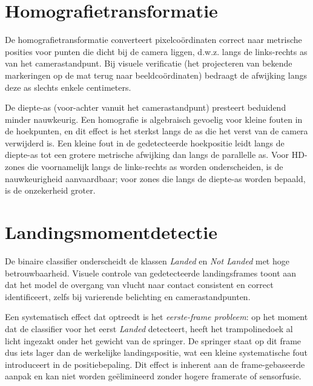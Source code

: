 
\section{Homografietransformatie}
\label{sec:evaluatie-homografie}

De homografietransformatie converteert pixelco{\"o}rdinaten correct naar metrische posities voor punten die dicht bij de camera liggen, d.w.z. langs de links-rechts as van het camerastandpunt. Bij visuele verificatie (het projecteren van bekende markeringen op de mat terug naar beeldco{\"o}rdinaten) bedraagt de afwijking langs deze as slechts enkele centimeters.

De diepte-as (voor-achter vanuit het camerastandpunt) presteert beduidend minder nauwkeurig. Een homografie is algebraisch gevoelig voor kleine fouten in de hoekpunten, en dit effect is het sterkst langs de as die het verst van de camera verwijderd is. Een kleine fout in de gedetecteerde hoekpositie leidt langs de diepte-as tot een grotere metrische afwijking dan langs de parallelle as. Voor HD-zones die voornamelijk langs de links-rechts as worden onderscheiden, is de nauwkeurigheid aanvaardbaar; voor zones die langs de diepte-as worden bepaald, is de onzekerheid groter.


\section{Landingsmomentdetectie}
\label{sec:evaluatie-landingsmoment}

De binaire classifier onderscheidt de klassen \textit{Landed} en \textit{Not Landed} met hoge betrouwbaarheid. Visuele controle van gedetecteerde landingsframes toont aan dat het model de overgang van vlucht naar contact consistent en correct identificeert, zelfs bij varierende belichting en camerastandpunten.

Een systematisch effect dat optreedt is het \textit{eerste-frame probleem}: op het moment dat de classifier voor het eerst \textit{Landed} detecteert, heeft het trampolinedoek al licht ingezakt onder het gewicht van de springer. De springer staat op dit frame dus iets lager dan de werkelijke landingspositie, wat een kleine systematische fout introduceert in de positiebepaling. Dit effect is inherent aan de frame-gebaseerde aanpak en kan niet worden ge{\"e}limineerd zonder hogere framerate of sensorfusie.

